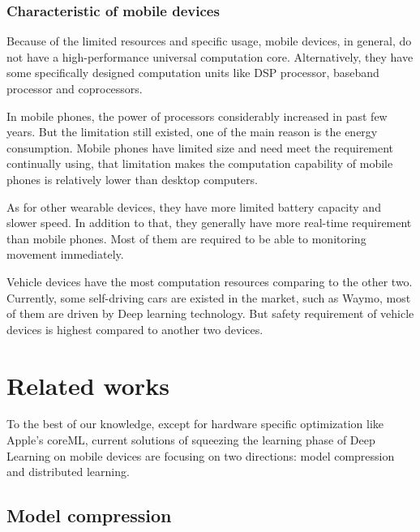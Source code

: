 \documentclass[article]{aaltoseries}
\begin{document}
\subsubsection{Characteristic of mobile devices}

Because of the limited resources and specific usage, mobile devices, in general, do not have a high-performance 
universal computation core. Alternatively, they have some specifically designed computation units like DSP processor,
baseband processor and coprocessors.

In mobile phones, the power of processors considerably increased in past few years. But the limitation still existed, 
one of the main reason is the energy consumption. Mobile phones have limited size and need meet the requirement continually
using, that limitation makes the computation capability of mobile phones is relatively lower than desktop computers.

As for other wearable devices, they have more limited battery capacity and slower speed. In addition to that, 
they generally have more real-time requirement than mobile phones. Most of them are required to be able to monitoring
movement immediately.

Vehicle devices have the most computation resources comparing to the other two. Currently, some self-driving
cars are existed in the market, such as Waymo, most of them are driven by Deep learning technology. 
But safety requirement of vehicle devices is highest compared to another two devices.  








\section{Related works}
\label{sec:related_works}

To the best of our knowledge, except for hardware specific optimization like Apple's coreML\cite{AppleInc.},
 current solutions of squeezing the learning phase of Deep Learning on mobile devices 
are focusing on two directions: model compression and distributed learning.

\subsection{Model compression}
\end{document}
